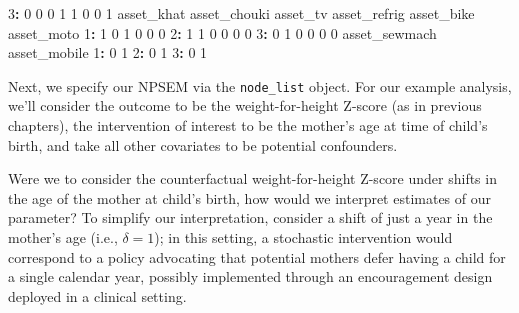 \documentclass[12pt, krantz2,]{krantz}
\newenvironment{Shaded}{\begin{snugshade}}{\end{snugshade}}
\newcommand{\DataTypeTok}[1]{\textcolor[rgb]{0.27,0.27,0.27}{#1}}
\newcommand{\DecValTok}[1]{\textcolor[rgb]{0.06,0.06,0.06}{#1}}
\newcommand{\KeywordTok}[1]{\textcolor[rgb]{0.27,0.27,0.27}{\textbf{#1}}}
\newcommand{\NormalTok}[1]{#1}
\newcommand{\OperatorTok}[1]{\textcolor[rgb]{0.43,0.43,0.43}{\textbf{#1}}}
\newcommand{\StringTok}[1]{\textcolor[rgb]{0.5,0.5,0.5}{#1}}
\theoremstyle{definition}
\theoremstyle{definition}
\theoremstyle{definition}
\newcommand{\1}{\mathbbm{1}}
\begin{document}
\begin{Shaded}
\begin{Highlighting}[]
\DecValTok{3}\OperatorTok{:}\StringTok{      }\DecValTok{0}    \DecValTok{0}     \DecValTok{0}     \DecValTok{1}    \DecValTok{1}              \DecValTok{0}           \DecValTok{0}           \DecValTok{1}
\NormalTok{   asset_khat asset_chouki asset_tv asset_refrig asset_bike asset_moto}
\DecValTok{1}\OperatorTok{:}\StringTok{          }\DecValTok{1}            \DecValTok{0}        \DecValTok{1}            \DecValTok{0}          \DecValTok{0}          \DecValTok{0}
\DecValTok{2}\OperatorTok{:}\StringTok{          }\DecValTok{1}            \DecValTok{1}        \DecValTok{0}            \DecValTok{0}          \DecValTok{0}          \DecValTok{0}
\DecValTok{3}\OperatorTok{:}\StringTok{          }\DecValTok{0}            \DecValTok{1}        \DecValTok{0}            \DecValTok{0}          \DecValTok{0}          \DecValTok{0}
\NormalTok{   asset_sewmach asset_mobile}
\DecValTok{1}\OperatorTok{:}\StringTok{             }\DecValTok{0}            \DecValTok{1}
\DecValTok{2}\OperatorTok{:}\StringTok{             }\DecValTok{0}            \DecValTok{1}
\DecValTok{3}\OperatorTok{:}\StringTok{             }\DecValTok{0}            \DecValTok{1}
\end{Highlighting}
\end{Shaded}

Next, we specify our NPSEM via the \texttt{node\_list} object. For our example analysis,
we'll consider the outcome to be the weight-for-height Z-score (as in previous
chapters), the intervention of interest to be the mother's age at time of
child's birth, and take all other covariates to be potential confounders.

\begin{Shaded}
\end{Shaded}

Were we to consider the counterfactual weight-for-height Z-score under shifts in
the age of the mother at child's birth, how would we interpret estimates of our
parameter? To simplify our interpretation, consider a shift of just a year in
the mother's age (i.e., \(\delta = 1\)); in this setting, a stochastic
intervention would correspond to a policy advocating that potential mothers
defer having a child for a single calendar year, possibly implemented through an
encouragement design deployed in a clinical setting.
\end{document}
